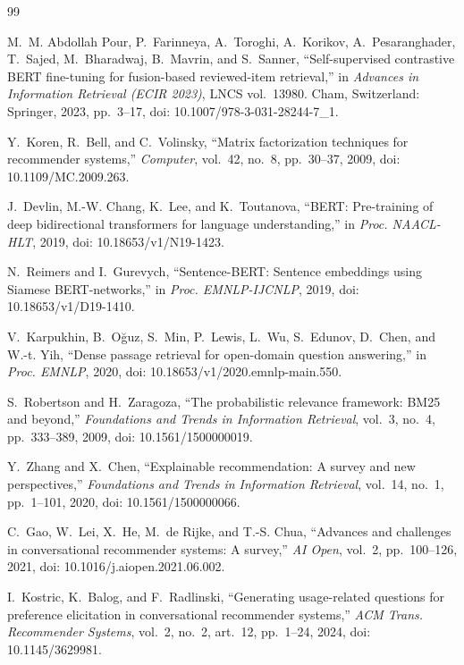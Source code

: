 \documentclass[10pt,twocolumn]{article}
\begin{document}
\begin{thebibliography}{99}

M.~M. Abdollah Pour, P.~Farinneya, A.~Toroghi, A.~Korikov, A.~Pesaranghader,
T.~Sajed, M.~Bharadwaj, B.~Mavrin, and S.~Sanner,
``Self-supervised contrastive BERT fine-tuning for fusion-based reviewed-item
retrieval,'' in \emph{Advances in Information Retrieval (ECIR 2023)}, LNCS vol.~13980.
Cham, Switzerland: Springer, 2023, pp.~3--17, doi: 10.1007/978-3-031-28244-7\_1.

Y.~Koren, R.~Bell, and C.~Volinsky, ``Matrix factorization techniques for recommender
systems,'' \emph{Computer}, vol.~42, no.~8, pp.~30--37, 2009,
doi: 10.1109/MC.2009.263.

J.~Devlin, M.-W. Chang, K.~Lee, and K.~Toutanova, ``BERT: Pre-training of deep
bidirectional transformers for language understanding,'' in \emph{Proc. NAACL-HLT},
2019, doi: 10.18653/v1/N19-1423.

N.~Reimers and I.~Gurevych, ``Sentence-BERT: Sentence embeddings using Siamese
BERT-networks,'' in \emph{Proc. EMNLP-IJCNLP}, 2019, doi: 10.18653/v1/D19-1410.

V.~Karpukhin, B.~O\u{g}uz, S.~Min, P.~Lewis, L.~Wu, S.~Edunov, D.~Chen, and W.-t. Yih,
``Dense passage retrieval for open-domain question answering,'' in \emph{Proc. EMNLP},
2020, doi: 10.18653/v1/2020.emnlp-main.550.

S.~Robertson and H.~Zaragoza, ``The probabilistic relevance framework: BM25 and
beyond,'' \emph{Foundations and Trends in Information Retrieval}, vol.~3, no.~4,
pp.~333--389, 2009, doi: 10.1561/1500000019.

Y.~Zhang and X.~Chen, ``Explainable recommendation: A survey and new perspectives,''
\emph{Foundations and Trends in Information Retrieval}, vol.~14, no.~1, pp.~1--101,
2020, doi: 10.1561/1500000066.

C.~Gao, W.~Lei, X.~He, M.~de Rijke, and T.-S. Chua, ``Advances and challenges in
conversational recommender systems: A survey,'' \emph{AI Open}, vol.~2, pp.~100--126,
2021, doi: 10.1016/j.aiopen.2021.06.002.

I.~Kostric, K.~Balog, and F.~Radlinski, ``Generating usage-related questions for
preference elicitation in conversational recommender systems,'' \emph{ACM Trans.
Recommender Systems}, vol.~2, no.~2, art.~12, pp.~1--24, 2024, doi: 10.1145/3629981.


\end{thebibliography}
\end{document}
